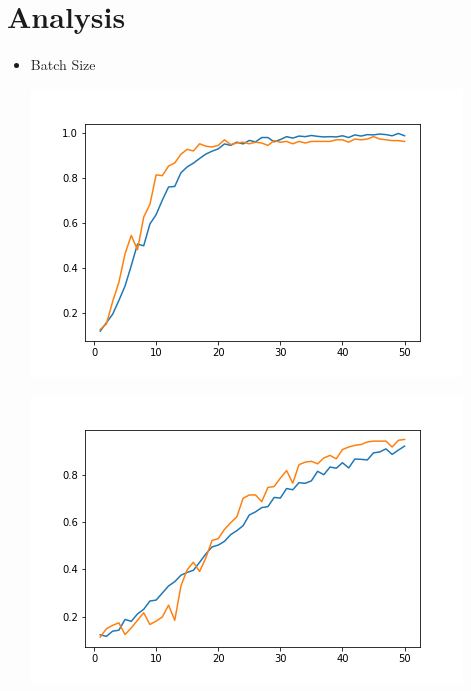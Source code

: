 \documentclass{article}
\begin{document}
\begin{sloppypar}
    \section{Analysis}

    \begin{itemize}
        \item Batch Size
            \begin{center}
                \begin{minipage}[b]{0.3\linewidth}
                    \includegraphics[width = \linewidth]{analysis/batch_size/b=1/b=1.png}
                \end{minipage}
                \hfill
                \begin{minipage}[b]{0.3\linewidth}
                    \includegraphics[width = \linewidth]{analysis/batch_size/b=5/b=5.png}

\end{minipage}
\end{center}
\end{itemize}
\end{sloppypar}
\end{document}
